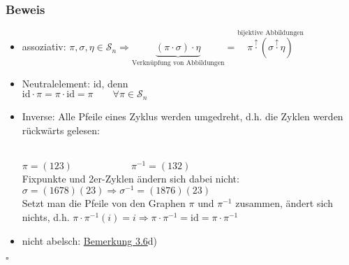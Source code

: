 \documentclass[a4paper, 12pt,titlepage, pdf, headsepline]{scrartcl}
\newcommand{\id}{\textrm{id}}
\newcommand{\qed}{\hfill$\square$}
\renewcommand{\>}{\rightarrow}
\renewcommand{\*}{\cdot}
\begin{document}
	      \subsubsection*{Beweis}
	      \begin{itemize}
	      	\item assoziativ: $\pi, \sigma, \eta \in \mathscr{S}_n \Rightarrow \underbrace{(\pi \cdot \sigma) \cdot \eta}_{\textrm{Verknüpfung von Abbildungen}} = \overset{\textrm{bijektive Abbildungen}}{\pi \overset{\uparrow}{\cdot} (\sigma \overset{\uparrow}{\cdot} \eta)}$
	      	\item Neutralelement: id, denn \\
	      	      $\id \cdot \pi = \pi \cdot \id = \pi\qquad\forall\pi\in\mathscr{S}_n$
	      	\item Inverse: Alle Pfeile eines Zyklus werden umgedreht, d.h. die Zyklen werden rückwärts gelesen:\\
	      	      \\
	      	      $\pi=(123)\qquad\qquad\qquad\pi^{-1}=(132)$\\
	      	      Fixpunkte und 2er-Zyklen ändern sich dabei nicht:\\
	      	      $\sigma = (1678)(23)\Rightarrow\sigma^{-1} = (1876)(23)$\\
	      	      Setzt man die Pfeile von den Graphen $\pi$ und $\pi^{-1}$ zusammen, ändert sich nichts, d.h. $\pi \cdot  \pi^{-1}(i) = i \Rightarrow \pi \cdot  \pi^{-1} = \id = \pi \cdot  \pi^{-1}$
	      	\item nicht abelsch: \hyperref[3.6]{Bemerkung 3.6}d)
	      \end{itemize}\qed\newpage
\end{document}
